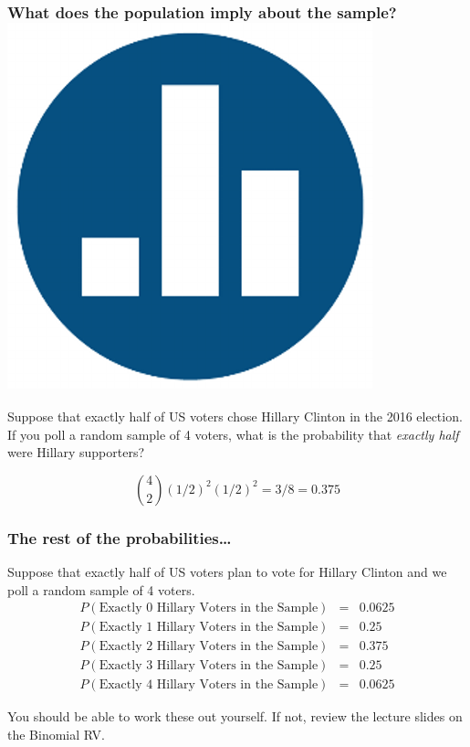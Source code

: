\begin{frame}
  \frametitle{What does the population imply about the sample? \hfill\includegraphics[scale = 0.05]{./images/clicker}}
Suppose that exactly half of US voters chose Hillary Clinton in the 2016 election.
If you poll a random sample of 4 voters, what is the probability that \emph{exactly half} were Hillary supporters? 

\pause

\alert{$${4 \choose 2} \left( 1/2 \right)^2 \left( 1/2 \right)^2 = 3/8 = 0.375$$}
\end{frame}
\begin{frame}
  \frametitle{The rest of the probabilities\dots}
  Suppose that exactly half of US voters plan to vote for Hillary Clinton and we poll a random sample of 4 voters.
  \begin{eqnarray*}
    P\left( \mbox{Exactly 0 Hillary Voters in the Sample} \right) &=& 0.0625\\
    P\left( \mbox{Exactly 1 Hillary Voters in the Sample} \right) &=& 0.25\\
    P\left( \mbox{Exactly 2 Hillary Voters in the Sample} \right) &=& 0.375\\
    P\left( \mbox{Exactly 3 Hillary Voters in the Sample} \right) &=& 0.25\\
    P\left( \mbox{Exactly 4 Hillary Voters in the Sample} \right) &=& 0.0625 
  \end{eqnarray*}

  \vspace{1em}
  \alert{You should be able to work these out yourself. If not, review the lecture slides on the Binomial RV.}
\end{frame}
